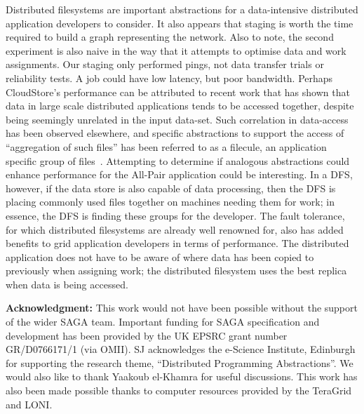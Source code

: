 \documentclass{rspublic}
\newcommand{\fixme}[1]{} \fi
\begin{document}
Distributed filesystems are important abstractions for a data-intensive
distributed application developers to consider.  It also appears that
staging is worth the time required to build a graph representing the
network.  Also to note, the second experiment is also naive in the way
that it attempts to optimise data and work assignments.  Our staging
only performed pings, not data transfer trials or reliability tests.  A
job could have low latency, but poor bandwidth.  Perhaps CloudStore's
performance can be attributed to recent work that has shown that data in
large scale distributed applications tends to be accessed together,
despite being seemingly unrelated in the input data-set.  Such
correlation in data-access has been observed elsewhere, and specific
abstractions to support the access of ``aggregation of such files'' has
been referred to as a filecule, an application specific group of
files~\citep{filecule}.  Attempting to determine if analogous
abstractions could enhance performance for the All-Pair application
could be interesting.  In a DFS, however, if the data store is also
capable of data processing, then the DFS is placing commonly used files
together on machines needing them for work; in essence, the DFS is
finding these groups for the developer.  The fault tolerance, for which
distributed filesystems are already well renowned for, also has added
benefits to grid application developers in terms of performance.  The
distributed application does not have to be aware of where data has been
copied to previously when assigning work; the distributed filesystem
uses the best replica when data is being accessed.

\fixme{This should be changed to be appropriate \bf{**Shantenu**}}
{\bf Acknowledgment:} This work would not have been possible without the support of 
     the wider SAGA team.  Important funding for SAGA
     specification and development has been provided by the UK EPSRC
     grant number GR/D0766171/1 (via OMII).  SJ acknowledges the
     e-Science Institute, Edinburgh for supporting the research theme,
     ``Distributed Programming Abstractions''.  We would also like to
     thank Yaakoub el-Khamra for useful discussions.  This work has also
     been made possible thanks to computer resources provided by the
     TeraGrid and LONI.

%
 

\end{document}
